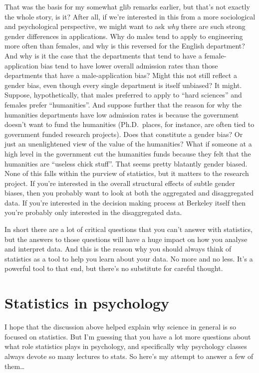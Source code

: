 \documentclass[
  a4paper,
]{book}
\begin{document}
That was the basis for my somewhat glib remarks earlier, but that's not
exactly the whole story, is it? After all, if we're interested in this
from a more sociological and psychological perspective, we might want to
ask \emph{why} there are such strong gender differences in applications.
Why do males tend to apply to engineering more often than females, and
why is this reversed for the English department? And why is it the case
that the departments that tend to have a female-application bias tend to
have lower overall admission rates than those departments that have a
male-application bias? Might this not still reflect a gender bias, even
though every single department is itself unbiased? It might. Suppose,
hypothetically, that males preferred to apply to ``hard sciences'' and
females prefer ``humanities''. And suppose further that the reason for
why the humanities departments have low admission rates is because the
government doesn't want to fund the humanities (Ph.D.~places, for
instance, are often tied to government funded research projects). Does
that constitute a gender bias? Or just an unenlightened view of the
value of the humanities? What if someone at a high level in the
government cut the humanities funds because they felt that the
humanities are ``useless chick stuff''. That seems pretty blatantly
gender biased. None of this falls within the purview of statistics, but
it matters to the research project. If you're interested in the overall
structural effects of subtle gender biases, then you probably want to
look at both the aggregated and disaggregated data. If you're interested
in the decision making process at Berkeley itself then you're probably
only interested in the disaggregated data.

In short there are a lot of critical questions that you can't answer
with statistics, but the answers to those questions will have a huge
impact on how you analyse and interpret data. And this is the reason why
you should always think of statistics as a tool to help you learn about
your data. No more and no less. It's a powerful tool to that end, but
there's no substitute for careful thought.

\section{Statistics in psychology}\label{statistics-in-psychology}

I hope that the discussion above helped explain why science in general
is so focused on statistics. But I'm guessing that you have a lot more
questions about what role statistics plays in psychology, and
specifically why psychology classes always devote so many lectures to
stats. So here's my attempt to answer a few of them\ldots{}
\end{document}
